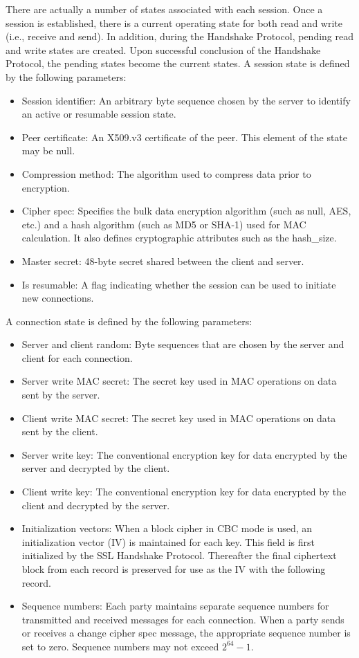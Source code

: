 \documentclass[12pt]{article}
\begin{document}
There are actually a number of states associated with each session. Once a session is established, there is a current operating state for both read and write (i.e., receive and send). In addition, during the Handshake Protocol, pending read and write states are created. Upon successful conclusion of the Handshake Protocol, the pending states become the current states.
A session state is defined by the following parameters:
\begin{itemize}

\item Session identifier: An arbitrary byte sequence chosen by the server to identify an active or resumable session state.
\item Peer certificate: An X509.v3 certificate of the peer. This element of the state may be null.
\item Compression method: The algorithm used to compress data prior to encryption.
\item Cipher spec: Specifies the bulk data encryption algorithm (such as null, AES, etc.) and a hash algorithm (such as MD5 or SHA-1) used for MAC calculation. It also defines cryptographic attributes such as the hash\_size.
\item Master secret: 48-byte secret shared between the client and server.
\item Is resumable: A flag indicating whether the session can be used to initiate new connections.
\end{itemize}
A connection state is defined by the following parameters:
\begin{itemize}
\item Server and client random: Byte sequences that are chosen by the server and client for each connection.
\item Server write MAC secret: The secret key used in MAC operations on data sent by the server.
\item Client write MAC secret: The secret key used in MAC operations on data sent by the client.
\item Server write key: The conventional encryption key for data encrypted by the server and
decrypted by the client.
\item Client write key: The conventional encryption key for data encrypted by the client and
decrypted by the server.
\item Initialization vectors: When a block cipher in CBC mode is used, an initialization vector (IV) is
maintained for each key. This field is first initialized by the SSL Handshake Protocol. Thereafter the final ciphertext block from each record is preserved for use as the IV with the following record.
\item Sequence numbers: Each party maintains separate sequence numbers for transmitted and received messages for each connection. When a party sends or receives a change cipher spec message, the appropriate sequence number is set to zero. Sequence numbers may not exceed $2^{64}-1$.
\end{itemize}
\end{document}
